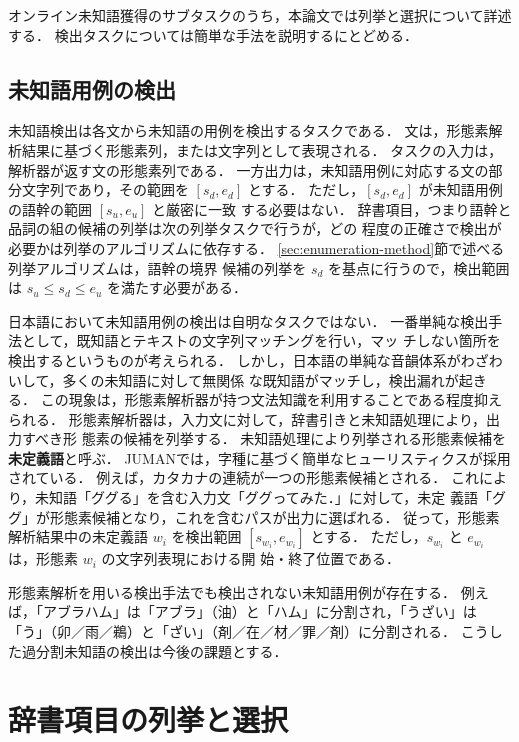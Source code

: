 \documentclass[japanese]{jnlp_1.4}
\begin{document}
オンライン未知語獲得のサブタスクのうち，本論文では列挙と選択について詳述
する．
検出タスクについては簡単な手法を説明するにとどめる．


\subsection{未知語用例の検出} \label{sec:detection}

未知語検出は各文から未知語の用例を検出するタスクである．
文は，形態素解析結果に基づく形態素列，または文字列として表現される．
タスクの入力は，解析器が返す文の形態素列である．
一方出力は，未知語用例に対応する文の部分文字列であり，その範囲を
$[s_d, e_d]$ とする．
ただし，$[s_d, e_d]$ が未知語用例の語幹の範囲 $[s_u, e_u]$ と厳密に一致
する必要はない．
辞書項目，つまり語幹と品詞の組の候補の列挙は次の列挙タスクで行うが，どの
程度の正確さで検出が必要かは列挙のアルゴリズムに依存する．
\ref{sec:enumeration-method}節で述べる列挙アルゴリズムは，語幹の境界
候補の列挙を $s_d$ を基点に行うので，検出範囲は
$s_u \leq s_d \leq e_u$ を満たす必要がある．


日本語において未知語用例の検出は自明なタスクではない．
一番単純な検出手法として，既知語とテキストの文字列マッチングを行い，マッ
チしない箇所を検出するというものが考えられる．
しかし，日本語の単純な音韻体系がわざわいして，多くの未知語に対して無関係
な既知語がマッチし，検出漏れが起きる．
この現象は，形態素解析器が持つ文法知識を利用することである程度抑えられる．
形態素解析器は，入力文に対して，辞書引きと未知語処理により，出力すべき形
態素の候補を列挙する．
未知語処理により列挙される形態素候補を{\bf 未定義語}と呼ぶ．
JUMANでは，字種に基づく簡単なヒューリスティクスが採用されている．
例えば，カタカナの連続が一つの形態素候補とされる．
これにより，未知語「ググる」を含む入力文「ググってみた．」に対して，未定
義語「ググ」が形態素候補となり，これを含むパスが出力に選ばれる．
従って，形態素解析結果中の未定義語 $w_i$ を検出範囲 $[s_{w_i}, e_{w_i}]$
とする．
ただし，$s_{w_i}$ と $e_{w_i}$ は，形態素 $w_i$ の文字列表現における開
始・終了位置である．

形態素解析を用いる検出手法でも検出されない未知語用例が存在する．
例えば，「アブラハム」は「アブラ」（油）と「ハム」に分割され，「うざい」は
「う」（卯／雨／鵜）と「ざい」（剤／在／材／罪／剤）に分割される．
こうした過分割未知語の検出は今後の課題とする．


\section{辞書項目の列挙と選択} \label{sec:enumeration-and-selection}
\end{document}
